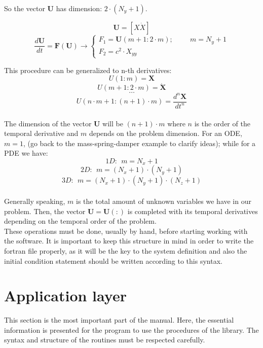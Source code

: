 So the vector $\mathbf{U}$ has dimension: $2\cdot(N_y+1)$.\\

\begin{framed}
$$
\mathbf U = [X \dot X]
$$
$$
\frac{d \mathbf U}{dt}= \mathbf F(\mathbf U) \longrightarrow 
\begin{cases}
F_1=\mathbf{U}(m+1:2\cdot m); \hspace{1cm} m=N_y+1\\
F_2=c^2\cdot X_{yy}
\end{cases}
$$
\end{framed}


This procedure can be generalized to n-th derivatives: 
$$
U(1:m)=\mathbf X 
$$
$$
U(m+1:2\cdot m) =\mathbf{\dot X}
$$
$$\ldots$$
$$
U \left(n\cdot m+1: (n+1)\cdot m \right)= \frac{d^n \mathbf X}{dt^n}
$$\\

The dimension of the vector $\mathbf{U}$ will be $(n+1)\cdot m$ where $n$ is the
order of the temporal derivative and $m$ depends on the problem dimension. For
an ODE, $m=1$, (go back to the mass-spring-damper example to clarify ideas);
while for a PDE we have:
$$ 1D: \:\: m=N_x+1 $$
$$ 2D: \:\: m=(N_x+1)\cdot (N_y+1)$$
$$ 3D: \:\: m=(N_x+1)\cdot (N_y+1) \cdot (N_z+1)$$\\

Generally speaking, $m$ is the total amount of unknown variables we have in our
problem. Then, the vector $\mathbf{U}=\mathbf{U}(:)$ is completed with its
temporal derivatives depending on the temporal order of the problem. \\

These operations must be done, usually by hand, before starting working with the
software.
It is important to keep this structure in mind in order to write the fortran file
properly, as it will be the key to the system definition and also the initial
condition statement should be written according to this syntax.\\

\newpage





\section{Application layer}

This section is the most important part of the manual. Here, the essential
information is presented for the program to use the procedures of the library.
The syntax and structure of the routines must be respected carefully. \\

